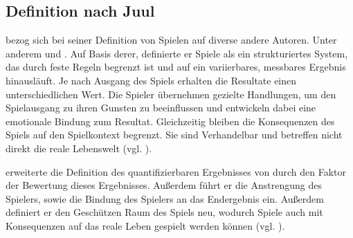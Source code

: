 \subsection{Definition nach Juul}

\citeauthor{juul_half-real_2005} bezog sich bei seiner Definition von Spielen auf diverse andere Autoren. Unter anderem \citeauthor{crawford_art_1984} und \citeauthor{salen_rules_2003}. Auf Basis derer, definierte er Spiele als ein strukturiertes System, das durch feste Regeln begrenzt ist und auf ein variierbares, messbares Ergebnis hinausläuft. Je nach Ausgang des Spiels erhalten die Resultate einen unterschiedlichen Wert. Die Spieler übernehmen gezielte Handlungen, um den Spielausgang zu ihren Gunsten zu beeinflussen und entwickeln dabei eine emotionale Bindung zum Resultat. Gleichzeitig bleiben die Konsequenzen des Spiels auf den Spielkontext begrenzt. Sie sind Verhandelbar und betreffen nicht direkt die reale Lebenswelt (vgl. \citealp[S. 36]{juul_half-real_2005}).

\citeauthor{juul_half-real_2005} erweiterte die Definition des quantifizierbaren Ergebnisses von \citeauthor{salen_rules_2003} durch den Faktor der Bewertung dieses Ergebnisses. Außerdem führt er die Anstrengung des Spielers, sowie die Bindung des Spielers an das Endergebnis ein. Außerdem definiert er den Geschützen Raum des Spiels neu, wodurch Spiele auch mit Konsequenzen auf das reale Leben gespielt werden können (vgl. \citealp[S. 36]{juul_half-real_2005}).



